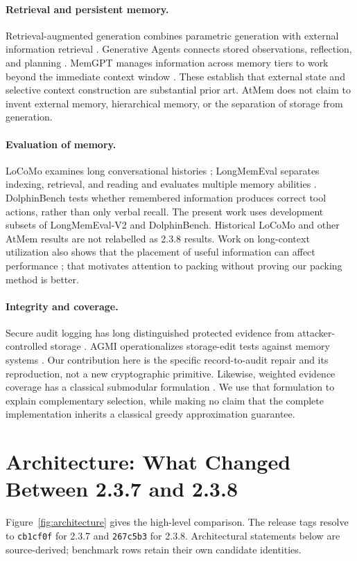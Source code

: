 \documentclass[11pt]{article}
\newcommand{\code}[1]{\texttt{\small #1}}
\begin{document}
\paragraph{Retrieval and persistent memory.}
Retrieval-augmented generation combines parametric generation with external information retrieval \citep{rag}. Generative Agents connects stored observations, reflection, and planning \citep{generative}. MemGPT manages information across memory tiers to work beyond the immediate context window \citep{memgpt}. These establish that external state and selective context construction are substantial prior art. AtMem does not claim to invent external memory, hierarchical memory, or the separation of storage from generation.

\paragraph{Evaluation of memory.}
LoCoMo examines long conversational histories \citep{locomo}; LongMemEval separates indexing, retrieval, and reading and evaluates multiple memory abilities \citep{lme}. DolphinBench tests whether remembered information produces correct tool actions, rather than only verbal recall. The present work uses development subsets of LongMemEval-V2 and DolphinBench. Historical LoCoMo and other AtMem results are not relabelled as 2.3.8 results. Work on long-context utilization also shows that the placement of useful information can affect performance \citep{lost}; that motivates attention to packing without proving our packing method is better.

\paragraph{Integrity and coverage.}
Secure audit logging has long distinguished protected evidence from attacker-controlled storage \citep{audit}. AGMI operationalizes storage-edit tests against memory systems \citep{agmi}. Our contribution here is the specific record-to-audit repair and its reproduction, not a new cryptographic primitive. Likewise, weighted evidence coverage has a classical submodular formulation \citep{submodular}. We use that formulation to explain complementary selection, while making no claim that the complete implementation inherits a classical greedy approximation guarantee.

\section{Architecture: What Changed Between 2.3.7 and 2.3.8}
\label{sec:architecture}
Figure~\ref{fig:architecture} gives the high-level comparison. The release tags resolve to \code{cb1cf0f} for 2.3.7 and \code{267c5b3} for 2.3.8. Architectural statements below are source-derived; benchmark rows retain their own candidate identities.
\end{document}

